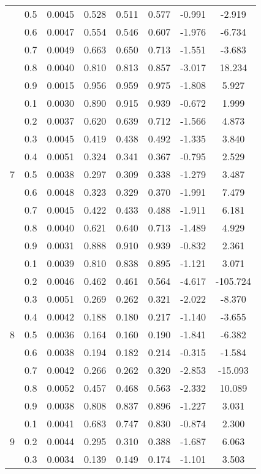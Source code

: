 \documentclass[11pt,a4paper]{report}
\begin{document}
\begin{longtable}{ | c | c || c | c | c | c | c | c | }
 & 0.5 & 0.0045 & 0.528 & 0.511 & 0.577 & -0.991 & -2.919 \\
 & 0.6 & 0.0047 & 0.554 & 0.546 & 0.607 & -1.976 & -6.734 \\
 & 0.7 & 0.0049 & 0.663 & 0.650 & 0.713 & -1.551 & -3.683 \\
 & 0.8 & 0.0040 & 0.810 & 0.813 & 0.857 & -3.017 & 18.234 \\
 & 0.9 & 0.0015 & 0.956 & 0.959 & 0.975 & -1.808 & 5.927 \\
 \hline
\multirow{9}{*}{7} & 0.1 & 0.0030 & 0.890 & 0.915 & 0.939 & -0.672 & 1.999 \\
 & 0.2 & 0.0037 & 0.620 & 0.639 & 0.712 & -1.566 & 4.873 \\
 & 0.3 & 0.0045 & 0.419 & 0.438 & 0.492 & -1.335 & 3.840 \\
 & 0.4 & 0.0051 & 0.324 & 0.341 & 0.367 & -0.795 & 2.529 \\
 & 0.5 & 0.0038 & 0.297 & 0.309 & 0.338 & -1.279 & 3.487 \\
 & 0.6 & 0.0048 & 0.323 & 0.329 & 0.370 & -1.991 & 7.479 \\
 & 0.7 & 0.0045 & 0.422 & 0.433 & 0.488 & -1.911 & 6.181 \\
 & 0.8 & 0.0040 & 0.621 & 0.640 & 0.713 & -1.489 & 4.929 \\
 & 0.9 & 0.0031 & 0.888 & 0.910 & 0.939 & -0.832 & 2.361 \\
 \hline
\multirow{9}{*}{8} & 0.1 & 0.0039 & 0.810 & 0.838 & 0.895 & -1.121 & 3.071 \\
 & 0.2 & 0.0046 & 0.462 & 0.461 & 0.564 & -4.617 & -105.724 \\
 & 0.3 & 0.0051 & 0.269 & 0.262 & 0.321 & -2.022 & -8.370 \\
 & 0.4 & 0.0042 & 0.188 & 0.180 & 0.217 & -1.140 & -3.655 \\
 & 0.5 & 0.0036 & 0.164 & 0.160 & 0.190 & -1.841 & -6.382 \\
 & 0.6 & 0.0038 & 0.194 & 0.182 & 0.214 & -0.315 & -1.584 \\
 & 0.7 & 0.0042 & 0.266 & 0.262 & 0.320 & -2.853 & -15.093 \\
 & 0.8 & 0.0052 & 0.457 & 0.468 & 0.563 & -2.332 & 10.089 \\
 & 0.9 & 0.0038 & 0.808 & 0.837 & 0.896 & -1.227 & 3.031 \\
 \hline
\multirow{9}{*}{9} & 0.1 & 0.0041 & 0.683 & 0.747 & 0.830 & -0.874 & 2.300 \\
 & 0.2 & 0.0044 & 0.295 & 0.310 & 0.388 & -1.687 & 6.063 \\
 & 0.3 & 0.0034 & 0.139 & 0.149 & 0.174 & -1.101 & 3.503 \\

\end{longtable}
\end{document}
